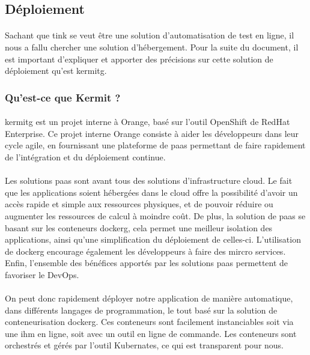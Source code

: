 \documentclass[12pt,a4paper]{report}
\begin{document}
\subsection{Déploiement}
\paragraph*{}Sachant que \gls{tink} se veut être une solution d'automatisation de test en ligne, il nous a fallu chercher une solution d'hébergement. Pour la suite du document, il est important d'expliquer et apporter des précisions sur cette solution de déploiement qu'est \gls{kermitg}. \\
\subsubsection{Qu'est-ce que Kermit ?}
\paragraph*{} \gls{kermitg} est un projet interne à Orange, basé sur l'outil OpenShift de RedHat Enterprise. Ce projet interne Orange consiste à aider les développeurs dans leur cycle agile, en fournissant une plateforme de \gls{paas} permettant de faire rapidement de l'intégration et du déploiement continue. 
\paragraph*{}Les solutions \gls{paas} sont avant tous des solutions d'infrastructure cloud. Le fait que les applications soient hébergées dans le cloud offre la possibilité d'avoir un accès rapide et simple aux ressources physiques, et de pouvoir réduire ou augmenter les ressources de calcul à moindre coût. De plus, la solution de \gls{paas} se basant sur les conteneurs \gls{dockerg}, cela permet une meilleur isolation des applications, ainsi qu'une simplification du déploiement de celles-ci. L'utilisation de \gls{dockerg} encourage également les développeurs à faire des mircro services. Enfin, l'ensemble des bénéfices apportés par les solutions \gls{paas} permettent de favoriser le DevOps.
\paragraph*{}On peut donc rapidement déployer notre application de manière automatique, dans différents langages de programmation, le tout basé sur la solution de conteneurisation \gls{dockerg}. Ces conteneurs sont facilement instanciables soit via une \gls{ihm} en ligne, soit avec un outil en ligne de commande. Les conteneurs sont orchestrés et gérés par l'outil Kubernates, ce qui est transparent pour nous. \\
\end{document}
